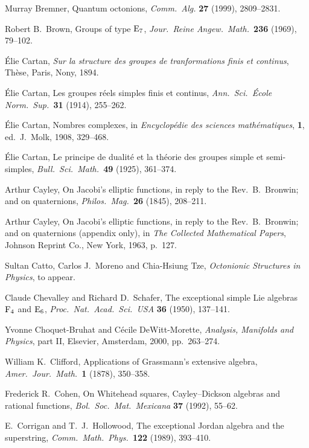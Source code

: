 \documentclass[12pt]{article}
\newcommand{\E}{{\rm E}}
\newcommand{\F}{{\rm F}}
\begin{document}
\begin{thebibliography}{10}
 Murray Bremner, Quantum octonions, 
{\sl Comm.\ Alg.} {\bf 27} (1999), 2809--2831.

 Robert B.\ Brown, Groups of type $\E_7$, {\sl
Jour.\ Reine Angew.\ Math.\ }{\bf 236} (1969), 79--102.

 \'Elie Cartan, {\sl Sur la structure des groupes
de tranformations finis et continus}, Th\`ese, Paris, Nony, 1894.

 \'Elie Cartan, Les groupes r\'eels simples finis et 
continus, {\sl Ann.\ Sci.\ \'Ecole Norm.\ Sup.\ }{\bf 31} (1914),  
255--262. 

 \'Elie Cartan, Nombres complexes, in {\sl 
Encyclop\'edie des sciences math\'ematiques}, {\bf 1}, ed.\ J.\ Molk, 
1908, 329--468.  

 \'Elie Cartan, Le principe de dualit\'e et la
th\'eorie des groupes simple et semi-simples, {\sl Bull.\ Sci.\ 
Math.\ }{\bf 49} (1925), 361--374.

 Arthur Cayley, On Jacobi's elliptic functions,
in reply to the Rev.\ B.\ Bronwin; and on quaternions, {\sl Philos.\
Mag.\ }{\bf 26} (1845), 208--211.  

 Arthur Cayley, On Jacobi's elliptic functions, in
reply to the Rev.\ B.\ Bronwin; and on quaternions (appendix only), in
{\sl The Collected Mathematical Papers}, Johnson Reprint Co., New York,
1963, p.\ 127.

 Sultan Catto, Carlos J.\ Moreno and Chia-Hsiung Tze,   
{\sl Octonionic Structures in Physics}, to appear.     
   
 Claude Chevalley and Richard D.\ Schafer, The exceptional    
simple Lie algebras $\F_4$ and $\E_6$, {\sl Proc.\ Nat.\ Acad.\ Sci.\ USA}   
{\bf 36} (1950), 137--141.    
 
 Yvonne Choquet-Bruhat and C\'ecile DeWitt-Morette,  
{\sl Analysis, Manifolds and Physics}, part II, Elsevier, Amsterdam, 
2000, pp.\ 263--274. 
 
 William K.\ Clifford, Applications of Grassmann's  
extensive algebra, {\sl Amer.\ Jour.\ Math.\ }{\bf 1} (1878), 350--358.  
   
\bibitem{Cohen} Frederick R.\ Cohen, On Whitehead squares, Cayley--Dickson    
algebras and rational functions, {\sl Bol.\ Soc.\ Mat.\ Mexicana}   
{\bf 37} (1992), 55--62.    

 E.\ Corrigan and T.\ J.\ Hollowood, The exceptional Jordan
algebra and the superstring, {\sl Comm.\ Math.\ Phys.\ }{\bf 122} (1989),
393--410.


\end{thebibliography}
\end{document}
